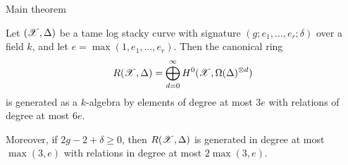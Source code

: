 \begin{frame}{Main theorem}


  \begin{theorem}[Voight,ZB]
Let $({\mathscr X},\Delta)$ be a tame log stacky curve with signature $(g;e_1,\ldots,e_r;\delta)$ over a field $k$, and let $e=\max(1,e_1,\dots,e_r)$.  Then the canonical ring 
\[ R({\mathscr X},\Delta) = \bigoplus_{d=0}^{\infty} H^0({\mathscr X},\Omega(\Delta)^{\otimes d}) \] 
is generated as a $k$-algebra by elements of degree at most $3e$ with relations of degree at most $6e$.




  \end{theorem}



  \begin{remark}
    Moreover, if $2g-2+\delta \geq 0$, then $R({\mathscr X},\Delta)$ is generated in degree at most $\max(3,e)$ with relations in degree at most $2\max(3,e)$.
  \end{remark}

\end{frame}
